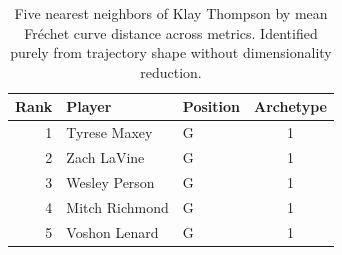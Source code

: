 \begin{table}[htbp]
  \centering\small
  \begin{tabular}{rllc}
    \toprule
    Rank & Player & Position & Archetype \\
    \midrule
    1 & Tyrese Maxey & G & 1 \\
    2 & Zach LaVine & G & 1 \\
    3 & Wesley Person & G & 1 \\
    4 & Mitch Richmond & G & 1 \\
    5 & Voshon Lenard & G & 1 \\
    \bottomrule
  \end{tabular}
  \caption{Five nearest neighbors of Klay Thompson by mean Fr\'{e}chet curve distance across metrics. Identified purely from trajectory shape without dimensionality reduction.}
  \label{tab:Klay_Thompson_frechet_curve_neighbors}
\end{table}

